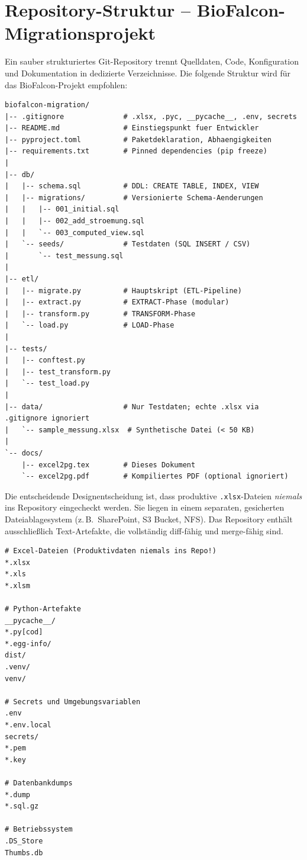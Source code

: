 ﻿\documentclass[12pt,a4paper]{report}
\theoremstyle{definition}
\theoremstyle{remark}
\newcommand{\code}[1]{\texttt{#1}}
\begin{document}
\section{Repository-Struktur -- BioFalcon-Migrationsprojekt}

Ein sauber strukturiertes Git-Repository trennt Quelldaten, Code,
Konfiguration und Dokumentation in dedizierte Verzeichnisse.
Die folgende Struktur wird für das BioFalcon-Projekt empfohlen:

\begin{lstlisting}[style=bash, caption={Empfohlene Monorepo-Struktur}]
biofalcon-migration/
|-- .gitignore              # .xlsx, .pyc, __pycache__, .env, secrets
|-- README.md               # Einstiegspunkt fuer Entwickler
|-- pyproject.toml          # Paketdeklaration, Abhaengigkeiten
|-- requirements.txt        # Pinned dependencies (pip freeze)
|
|-- db/
|   |-- schema.sql          # DDL: CREATE TABLE, INDEX, VIEW
|   |-- migrations/         # Versionierte Schema-Aenderungen
|   |   |-- 001_initial.sql
|   |   |-- 002_add_stroemung.sql
|   |   `-- 003_computed_view.sql
|   `-- seeds/              # Testdaten (SQL INSERT / CSV)
|       `-- test_messung.sql
|
|-- etl/
|   |-- migrate.py          # Hauptskript (ETL-Pipeline)
|   |-- extract.py          # EXTRACT-Phase (modular)
|   |-- transform.py        # TRANSFORM-Phase
|   `-- load.py             # LOAD-Phase
|
|-- tests/
|   |-- conftest.py
|   |-- test_transform.py
|   `-- test_load.py
|
|-- data/                   # Nur Testdaten; echte .xlsx via .gitignore ignoriert
|   `-- sample_messung.xlsx  # Synthetische Datei (< 50 KB)
|
`-- docs/
    |-- excel2pg.tex        # Dieses Dokument
    `-- excel2pg.pdf        # Kompiliertes PDF (optional ignoriert)
\end{lstlisting}

Die entscheidende Designentscheidung ist, dass produktive \code{.xlsx}-Dateien
\emph{niemals} ins Repository eingecheckt werden. Sie liegen in einem
separaten, gesicherten Dateiablagesystem (z.\,B.\ SharePoint, S3 Bucket,
NFS). Das Repository enthält ausschließlich Text-Artefakte, die vollständig
diff-fähig und merge-fähig sind.

\begin{lstlisting}[style=bash, caption={.gitignore für das Migrationsprojekt}]
# Excel-Dateien (Produktivdaten niemals ins Repo!)
*.xlsx
*.xls
*.xlsm

# Python-Artefakte
__pycache__/
*.py[cod]
*.egg-info/
dist/
.venv/
venv/

# Secrets und Umgebungsvariablen
.env
*.env.local
secrets/
*.pem
*.key

# Datenbankdumps
*.dump
*.sql.gz

# Betriebssystem
.DS_Store
Thumbs.db
\end{lstlisting}
\end{document}
